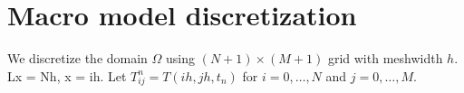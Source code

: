 \documentclass[a4paper,12pt]{article}
\begin{document}
%
%
%
%

\section{Macro model discretization}

We discretize the domain $\Omega$ using $(N+1) \times (M+1)$ grid with meshwidth $h$. Lx = Nh, x = ih.
Let $T_{ij}^n=T(ih, jh, t_n )$ for $i=0,\dots,N$ and $j = 0, \dots, M$.
\end{document}
